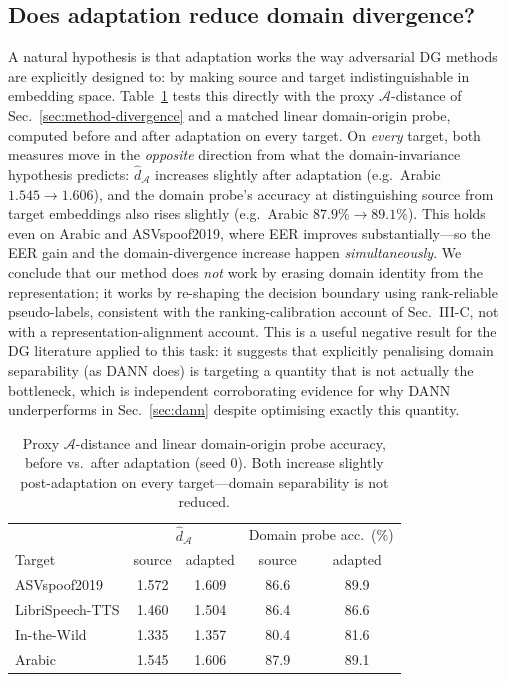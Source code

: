 \documentclass[conference]{IEEEtran}
\begin{document}
\subsection{Does adaptation reduce domain divergence?}
\label{sec:divergence}
A natural hypothesis is that adaptation works the way adversarial DG methods
are explicitly designed to: by making source and target indistinguishable in
embedding space. Table~\ref{tab:divergence} tests this directly with the proxy
$\mathcal{A}$-distance of Sec.~\ref{sec:method-divergence} and a matched linear
domain-origin probe, computed before and after adaptation on every target. On
\emph{every} target, both measures move in the \emph{opposite} direction from
what the domain-invariance hypothesis predicts: $\hat d_{\mathcal{A}}$
increases slightly after adaptation (e.g.\ Arabic $1.545\!\to\!1.606$), and the
domain probe's accuracy at distinguishing source from target embeddings also
rises slightly (e.g.\ Arabic $87.9\%\!\to\!89.1\%$). This holds even on
Arabic and ASVspoof2019, where EER improves substantially---so the EER gain
and the domain-divergence increase happen \emph{simultaneously}. We conclude
that our method does \emph{not} work by erasing domain identity from the
representation; it works by re-shaping the decision boundary using
rank-reliable pseudo-labels, consistent with the ranking-calibration account
of Sec.~III-C, not with a representation-alignment account. This is a useful
negative result for the DG literature applied to this task: it suggests that
explicitly penalising domain separability (as DANN does) is targeting a
quantity that is not actually the bottleneck, which is independent corroborating
evidence for why DANN underperforms in Sec.~\ref{sec:dann} despite optimising
exactly this quantity.

\begin{table}[t]
\centering
\caption{Proxy $\mathcal{A}$-distance and linear domain-origin probe accuracy,
before vs.\ after adaptation (seed 0). Both increase slightly post-adaptation
on every target---domain separability is not reduced.}
\label{tab:divergence}
\begin{tabular}{@{}lcccc@{}}
\toprule
& \multicolumn{2}{c}{$\hat d_{\mathcal{A}}$} & \multicolumn{2}{c}{Domain probe acc.\ (\%)} \\
Target & source & adapted & source & adapted \\
\midrule
ASVspoof2019 & 1.572 & 1.609 & 86.6 & 89.9 \\
LibriSpeech-TTS & 1.460 & 1.504 & 86.4 & 86.6 \\
In-the-Wild & 1.335 & 1.357 & 80.4 & 81.6 \\
Arabic & 1.545 & 1.606 & 87.9 & 89.1 \\
\bottomrule
\end{tabular}
\end{table}
\end{document}
